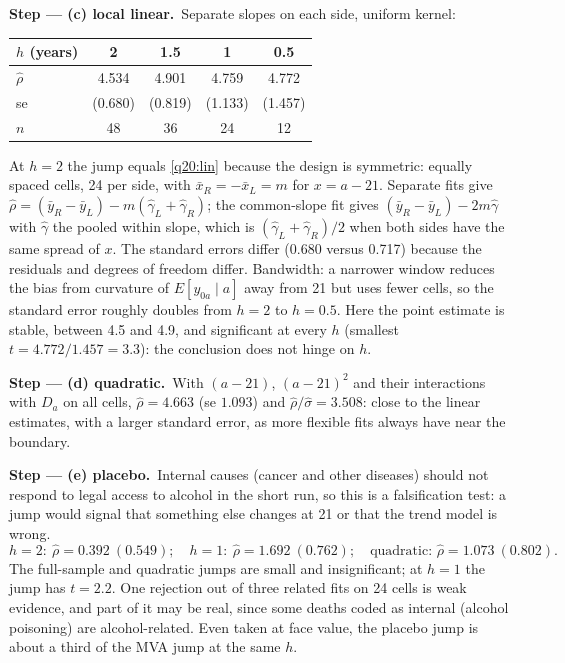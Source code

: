 \documentclass[11pt,a4paper]{article}
\newcommand{\passo}[2]{\par\smallskip\noindent\textbf{Step --- #1.}~#2}
\begin{document}
\begin{sol}
\passo{(c) local linear}{Separate slopes on each side, uniform kernel:
\begin{center}\small
\begin{tabular}{lcccc}
\toprule
$h$ (years) & 2 & 1.5 & 1 & 0.5\\
\midrule
$\hat\rho$ & 4.534 & 4.901 & 4.759 & 4.772\\
se & (0.680) & (0.819) & (1.133) & (1.457)\\
$n$ & 48 & 36 & 24 & 12\\
\bottomrule
\end{tabular}
\end{center}
At $h=2$ the jump equals \eqref{q20:lin} because the design is symmetric: equally spaced cells, 24 per side,
with $\bar x_R=-\bar x_L=m$ for $x=a-21$. Separate fits give $\hat\rho=(\bar y_R-\bar y_L)-m(\hat\gamma_L+\hat\gamma_R)$;
the common-slope fit gives $(\bar y_R-\bar y_L)-2m\hat\gamma$ with $\hat\gamma$ the pooled within slope, which is
$(\hat\gamma_L+\hat\gamma_R)/2$ when both sides have the same spread of $x$. The standard errors differ
(0.680 versus 0.717) because the residuals and degrees of freedom differ. Bandwidth: a narrower window
reduces the bias from curvature of $E[y_{0a}\mid a]$ away from 21 but uses fewer cells, so the standard error
roughly doubles from $h=2$ to $h=0.5$. Here the point estimate is stable, between 4.5 and 4.9, and
significant at every $h$ (smallest $t=4.772/1.457=3.3$): the conclusion does not hinge on $h$.}

\passo{(d) quadratic}{With $(a-21)$, $(a-21)^2$ and their interactions with $D_a$ on all cells,
$\hat\rho=4.663$ (se $1.093$) and $\hat\rho/\hat\sigma=3.508$: close to the linear estimates, with a larger
standard error, as more flexible fits always have near the boundary.}

\passo{(e) placebo}{Internal causes (cancer and other diseases) should not respond to legal access to
alcohol in the short run, so this is a falsification test: a jump would signal that something else changes
at 21 or that the trend model is wrong.
\begin{equation}
h=2:\ \hat\rho=0.392\ (0.549);\quad h=1:\ \hat\rho=1.692\ (0.762);\quad\text{quadratic: }\hat\rho=1.073\ (0.802).\label{q20:plac}
\end{equation}
The full-sample and quadratic jumps are small and insignificant; at $h=1$ the jump has $t=2.2$. One rejection
out of three related fits on 24 cells is weak evidence, and part of it may be real, since some deaths
coded as internal (alcohol poisoning) are alcohol-related. Even taken at face value, the placebo jump is
about a third of the MVA jump at the same $h$.}


\end{sol}
\end{document}
